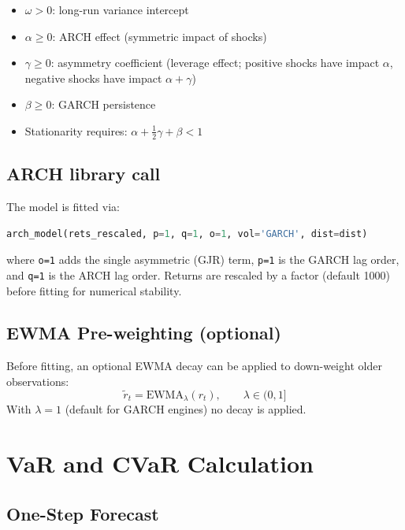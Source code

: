 \documentclass[11pt, a4paper]{article}
\begin{document}
\begin{itemize}
  \item $\omega > 0$: long-run variance intercept
  \item $\alpha \geq 0$: ARCH effect (symmetric impact of shocks)
  \item $\gamma \geq 0$: asymmetry coefficient (leverage effect;
        positive shocks have impact $\alpha$, negative shocks have
        impact $\alpha + \gamma$)
  \item $\beta \geq 0$: GARCH persistence
  \item Stationarity requires: $\alpha + \tfrac{1}{2}\gamma + \beta < 1$
\end{itemize}

\subsection{ARCH library call}

The model is fitted via:
\begin{lstlisting}[language=Python]
arch_model(rets_rescaled, p=1, q=1, o=1, vol='GARCH', dist=dist)
\end{lstlisting}
where \texttt{o=1} adds the single asymmetric (GJR) term,
\texttt{p=1} is the GARCH lag order, and \texttt{q=1} is the ARCH lag order.
Returns are rescaled by a factor (default 1000) before fitting for
numerical stability.

\subsection{EWMA Pre-weighting (optional)}

Before fitting, an optional EWMA decay can be applied to down-weight
older observations:
\begin{equation}
\tilde{r}_t = \text{EWMA}_\lambda(r_t), \qquad \lambda \in (0,1]
\end{equation}
With $\lambda = 1$ (default for GARCH engines) no decay is applied.

\section{VaR and CVaR Calculation}

\subsection{One-Step Forecast}
\end{document}
